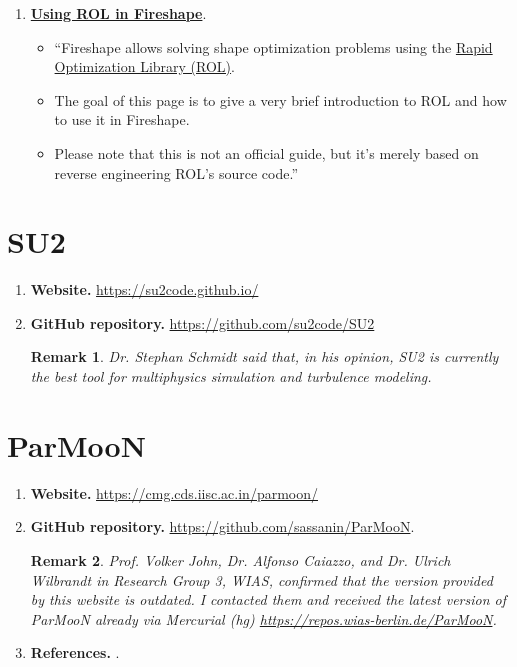 \documentclass[onsided]{book}
\numberwithin{equation}{section}
\newtheorem{remark}{Remark}[section]
\begin{document}
\begin{enumerate}
\begin{enumerate}
        \item \href{https://fireshape.readthedocs.io/en/latest/ROL.html}{\textbf{Using ROL in Fireshape}}.
        \begin{itemize}
            \item ``Fireshape allows solving shape optimization problems using the \href{https://trilinos.org/packages/rol/}{Rapid Optimization Library (ROL)}.
            \item The goal of this page is to give a very brief introduction to ROL and how to use it in Fireshape.
            \item Please note that this is not an official guide, but it's merely based on reverse engineering ROL's source code.''
        \end{itemize}
    \end{enumerate}    
\end{enumerate}

\section{SU2}
\begin{enumerate}
    \item \textbf{Website.} \url{https://su2code.github.io/}
    \item \textbf{GitHub repository.} \url{https://github.com/su2code/SU2}

    \begin{remark}
        Dr. Stephan Schmidt said that, in his opinion, SU2 is currently the best tool for multiphysics simulation and turbulence modeling.
    \end{remark}
\end{enumerate}

\section{ParMooN}
\begin{enumerate}
    \item \textbf{Website.} \url{https://cmg.cds.iisc.ac.in/parmoon/}
    \item \textbf{GitHub repository.} \url{https://github.com/sassanin/ParMooN}.
    \begin{remark}
        Prof. Volker John, Dr. Alfonso Caiazzo, and Dr. Ulrich Wilbrandt in Research Group 3, WIAS, confirmed that the version provided by this website is outdated. I contacted them and received the latest version of ParMooN already via Mercurial (hg) \url{https://repos.wias-berlin.de/ParMooN}.
    \end{remark}
    \item \textbf{References.} \cite{ParMooN2017}.
\end{enumerate}
\end{document}

